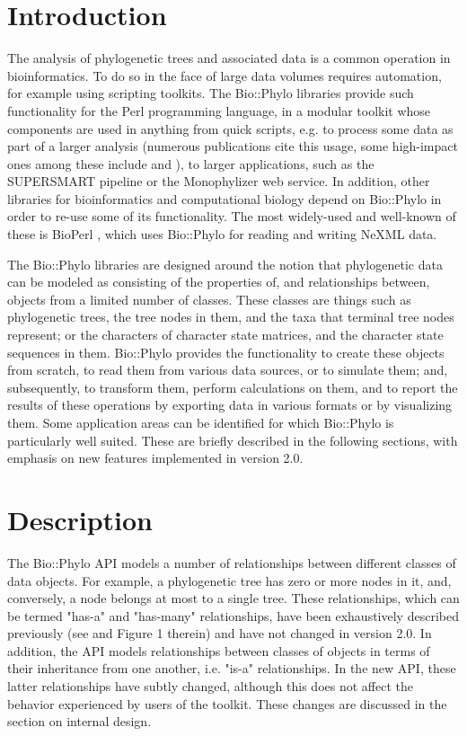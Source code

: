 \documentclass{bioinfo}
\begin{document}
\section{Introduction}

The analysis of phylogenetic trees and associated data is a common operation in 
bioinformatics. To do so in the face of large data volumes requires automation, for 
example using scripting toolkits. The Bio::Phylo libraries \citep{Vos2011} provide such 
functionality for the Perl programming language, in a modular toolkit whose components are 
used in anything from quick scripts, e.g. to process some data as part of a larger 
analysis (numerous publications cite this usage, some high-impact ones among these include 
\citet{Hayward2015} and \citet{Smet2013}), to larger applications, such as the SUPERSMART 
pipeline \citep{Antonelli2017} or the Monophylizer \citep{Mutanen2016} web service. In 
addition, other libraries for bioinformatics and computational biology depend on 
Bio::Phylo in order to re-use some of its functionality. The most widely-used and 
well-known of these is BioPerl \citep{Stajich2002}, which uses Bio::Phylo for reading and 
writing NeXML \citep{Vos2012} data. 

The Bio::Phylo libraries are designed around the notion that phylogenetic data can be 
modeled as consisting of the properties of, and relationships between, objects from a 
limited number of classes. These classes are things such as phylogenetic trees, the tree 
nodes in them, and the taxa that terminal tree nodes represent; or the characters of 
character state matrices, and the character state sequences in them. Bio::Phylo provides 
the functionality to create these objects from scratch, to read them from various data 
sources, or to simulate them; and, subsequently, to transform them, perform calculations 
on them, and to report the results of these operations by exporting data in various 
formats or by visualizing them. Some application areas can be identified for which 
Bio::Phylo is particularly well suited. These are briefly described in the following 
sections, with emphasis on new features implemented in version 2.0.

\section{Description}

The Bio::Phylo API models a number of relationships between different classes of data 
objects. For example, a phylogenetic tree has zero or more nodes in it, and, conversely, 
a node belongs at most to a single tree. These relationships, which can be termed "has-a" 
and "has-many" relationships, have been exhaustively described previously (see 
\citet{Vos2011} and Figure 1 therein) and have not changed in version 2.0. In addition, 
the API models relationships between classes of objects in terms of their inheritance from 
one another, i.e. "is-a" relationships. In the new API, these latter relationships have 
subtly changed, although this does not affect the behavior experienced by users of the 
toolkit. These changes are discussed in the section on internal design.
\end{document}

